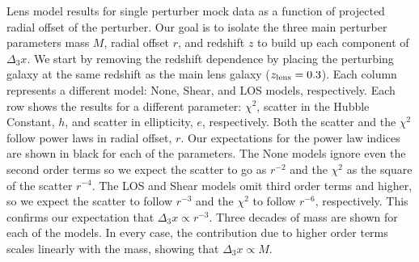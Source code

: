 \label{masscompare} Lens model results for single perturber mock data as a function of projected radial offset of the perturber. Our goal is to isolate the three main perturber parameters mass $M$, radial offset $r$, and redshift $z$ to build up each component of $\Delta_3 x$. We start by removing the redshift dependence by placing the perturbing galaxy at the same redshift as the main lens galaxy ($z_{\rm{lens}} = 0.3$). Each column represents a different model: None, Shear, and LOS models, respectively. Each row shows the results for a different parameter: $\chi^2$, scatter in the Hubble Constant, $h$, and scatter in ellipticity, $e$, respectively. Both the scatter and the $\chi^2$ follow power laws in radial offset, $r$. Our expectations for the power law indices are shown in black for each of the parameters. The None models ignore even the second order terms so we expect the scatter to go as $r^{-2}$ and the $\chi^2$ as the square of the scatter $r^{-4}$. The LOS and Shear models omit third order terms and higher, so we expect the scatter to follow $r^{-3}$ and the $\chi^2$ to follow $r^{-6}$, respectively. This confirms our expectation that $\Delta_3 x \propto r^{-3}$. Three decades of mass are shown for each of the models. In every case, the contribution due to higher order terms scales linearly with the mass, showing that $\Delta_3 x \propto M$.